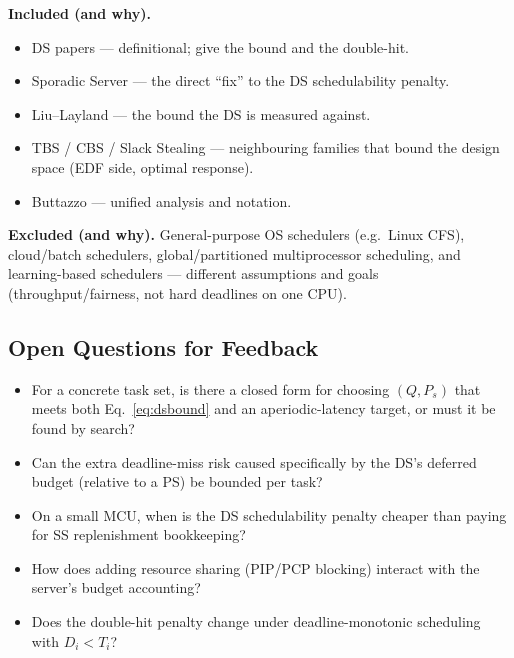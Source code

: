\documentclass[conference]{IEEEtran}
\begin{document}
\noindent\textbf{Included (and why).}
\begin{itemize}
  \item DS papers \cite{lehoczky1987enhanced,strosnider1995deferrable} ---
        definitional; give the bound and the double-hit.
  \item Sporadic Server \cite{sprunt1989aperiodic} --- the direct ``fix'' to
        the DS schedulability penalty.
  \item Liu--Layland \cite{liu1973scheduling} --- the bound the DS is measured
        against.
  \item TBS / CBS / Slack Stealing
        \cite{spuri1996scheduling,abeni1998integrating,lehoczky1992slack} ---
        neighbouring families that bound the design space (EDF side, optimal
        response).
  \item Buttazzo \cite{buttazzo2011hard} --- unified analysis and notation.
\end{itemize}

\noindent\textbf{Excluded (and why).} General-purpose OS schedulers (e.g.\
Linux CFS), cloud/batch schedulers, global/partitioned multiprocessor
scheduling, and learning-based schedulers --- different assumptions and goals
(throughput/fairness, not hard deadlines on one CPU).

\subsection{Open Questions for Feedback}

\begin{itemize}
  \item For a concrete task set, is there a closed form for choosing $(Q,P_s)$
        that meets both Eq.~\eqref{eq:dsbound} and an aperiodic-latency target,
        or must it be found by search?
  \item Can the extra deadline-miss risk caused specifically by the DS's
        deferred budget (relative to a PS) be bounded per task?
  \item On a small MCU, when is the DS schedulability penalty cheaper than
        paying for SS replenishment bookkeeping?
  \item How does adding resource sharing (PIP/PCP blocking) interact with the
        server's budget accounting?
  \item Does the double-hit penalty change under deadline-monotonic scheduling
        with $D_i < T_i$?
\end{itemize}
\end{document}
